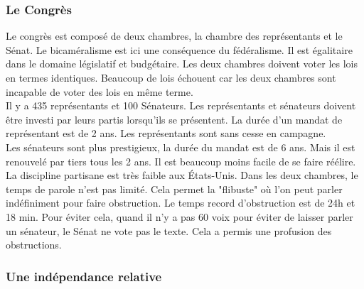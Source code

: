 \documentclass[10pt, a4paper, openany]{book}
\begin{document}
\subsubsection{Le Congrès}

Le congrès est composé de deux chambres, la chambre des représentants et le Sénat. Le bicaméralisme est ici une conséquence du fédéralisme. Il est égalitaire dans le domaine législatif et budgétaire. Les deux chambres doivent voter les lois en termes identiques. Beaucoup de lois échouent car les deux chambres sont incapable de voter des lois en même terme. \\
Il y a 435 représentants et 100 Sénateurs. Les représentants et sénateurs doivent être investi par leurs partis lorsqu'ils se présentent. La durée d'un mandat de représentant est de 2 ans. Les représentants sont sans cesse en campagne. \\
Les sénateurs sont plus prestigieux, la durée du mandat est de 6 ans. Mais il est renouvelé par tiers tous les 2 ans. Il est beaucoup moins facile de se faire réélire. \\
La discipline partisane est très faible aux États-Unis. Dans les deux chambres, le temps de parole n'est pas limité. Cela permet la "flibuste" où l'on peut parler indéfiniment pour faire obstruction. Le temps record d'obstruction est de 24h et 18 min. Pour éviter cela, quand il n'y a pas 60 voix pour éviter de laisser parler un sénateur, le Sénat ne vote pas le texte. Cela a permis une profusion des obstructions. 

\subsubsection{Une indépendance relative}
\end{document}
